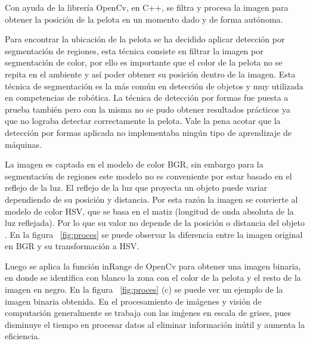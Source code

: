 Con ayuda de la librería OpenCv, en \gls{C++}, se filtra y procesa la imagen para obtener la posición de la pelota en un momento dado y de forma autónoma. 

Para encontrar la ubicación de la pelota  se ha decidido aplicar detección por segmentación de regiones, esta técnica consiste en filtrar la imagen por segmentaci\'on de color, por ello es importante que el color de la pelota no se repita en el ambiente y así poder obtener su posición dentro de la imagen. Esta t\'ecnica de segmentaci\'on es la m\'as com\'un en detecci\'on de objetos y muy utilizada en competencias de rob\'otica. La t\'ecnica de detecci\'on por  formas fue puesta a prueba tambi\'en pero con la misma no se pudo obtener resultados pr\'acticos ya que no lograba detectar correctamente la pelota. Vale la pena acotar que la detecci\'on por formas aplicada no implementaba ning\'un tipo de aprendizaje de m\'aquinas.

La imagen es captada en el modelo de color \gls{BGR}, sin embargo para la segmentación de regiones este modelo no es conveniente por estar basado en el reflejo de la luz. El reflejo de la luz  que proyecta un objeto puede variar dependiendo de su posición y distancia. Por esta razón la imagen se convierte al modelo de color \gls{HSV}, que se basa en el matiz (longitud de onda absoluta de la luz reflejada). Por lo que su valor no depende de la posición o distancia del objeto \cite{AiRobotics}. En la figura ~\ref{fig:proces} se puede observar la diferencia entre la imagen original en BGR y su transformación a HSV.     

Luego se aplica la función inRange de OpenCv para obtener una imagen binaria, en donde se identifica con blanco la zona con el color de la pelota y el resto de la imagen en negro. En la figura ~\ref{fig:proces} (c) se puede ver un ejemplo de la imagen binaria obtenida. En el procesamiento de im\'agenes y visi\'on de computaci\'on generalmente se trabaja con las im\'genes en escala de grises, pues disminuye el tiempo en procesar datos al eliminar informaci\'on inútil y aumenta la eficiencia.

